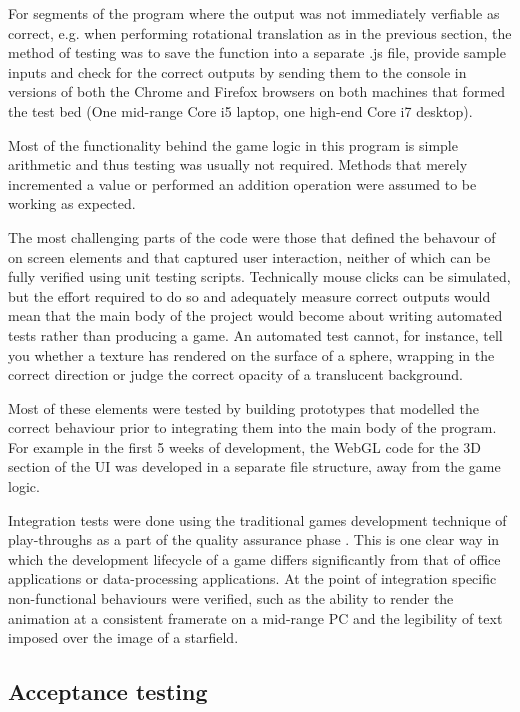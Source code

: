 \documentclass[twoside]{bhamthesis}
\begin{document}
For segments of the program where the output was not immediately verfiable as correct, e.g. when performing rotational translation as in the previous section, the method of testing was to save the function into a separate .js file, provide sample inputs and check for the correct outputs by sending them to the console in versions of both the Chrome and Firefox browsers on both machines that formed the test bed (One mid-range Core i5 laptop, one high-end Core i7 desktop).

Most of the functionality behind the game logic in this program is simple arithmetic and thus testing was usually not required. Methods that merely incremented a value or performed an addition operation were assumed to be working as expected.

The most challenging parts of the code were those that defined the behavour of on screen elements and that captured user interaction, neither of which can be fully verified using unit testing scripts. Technically mouse clicks can be simulated, but the effort required to do so and adequately measure correct outputs would mean that the main body of the project would become about writing automated tests rather than producing a game. An automated test cannot, for instance, tell you whether a texture has rendered on the surface of a sphere, wrapping in the correct direction or judge the correct opacity of a translucent background.

Most of these elements were tested by building prototypes that modelled the correct behaviour prior to integrating them into the main body of the program. For example in the first 5 weeks of development, the WebGL code for the 3D section of the UI was developed in a separate file structure, away from the game logic.

Integration tests were done using the traditional games development technique of play-throughs as a part of the quality assurance phase \cite{chandler_game_2009}. This is one clear way in which the development lifecycle of a game differs significantly from that of office applications or data-processing applications. At the point of integration specific non-functional behaviours were verified, such as the ability to render the animation at a consistent framerate on a mid-range PC and the legibility of text imposed over the image of a starfield.

\subsection{Acceptance testing}
\end{document}
